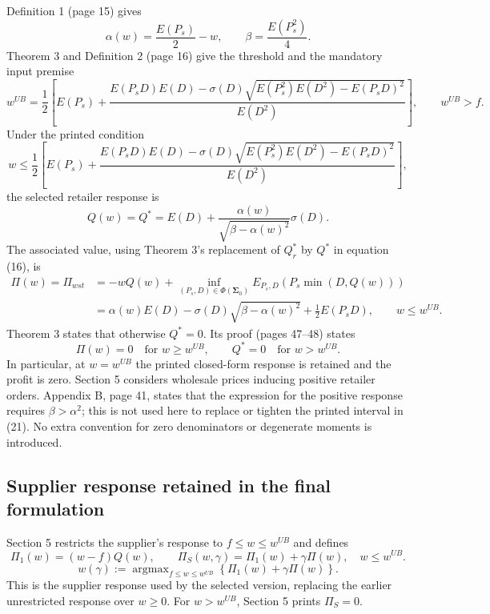 \documentclass{article}
\begin{document}
Definition 1 (page 15) gives
\[
\alpha(w)=\frac{E(P_s)}{2}-w,\qquad
\beta=\frac{E(P_s^2)}{4}.
\]
Theorem 3 and Definition 2 (page 16) give the threshold and the mandatory input premise
\[
w^{UB}=\frac12\left[
E(P_s)+
\frac{E(P_sD)E(D)-\sigma(D)\sqrt{E(P_s^2)E(D^2)-E(P_sD)^2}}
{E(D^2)}
\right],\qquad w^{UB}>f.
\]
Under the printed condition
\begin{equation}
w\leq\frac12\left[
E(P_s)+
\frac{E(P_sD)E(D)-\sigma(D)\sqrt{E(P_s^2)E(D^2)-E(P_sD)^2}}
{E(D^2)}
\right],
\tag{17}
\end{equation}
the selected retailer response is
\begin{equation}
Q(w)=Q^*=E(D)+\frac{\alpha(w)}{\sqrt{\beta-\alpha(w)^2}}\sigma(D).
\tag{18}
\end{equation}
The associated value, using Theorem 3's replacement of $Q_r^*$ by $Q^*$ in equation (16), is
\begin{equation}
\begin{aligned}
\Pi(w)=\Pi_{wst}
&=-wQ(w)+\inf_{(P_s,D)\in\Phi(\boldsymbol{\Sigma}_0)}
E_{P_s,D}\!\left(P_s\min(D,Q(w))\right)\\
&=\alpha(w)E(D)-\sigma(D)\sqrt{\beta-\alpha(w)^2}
+\frac12E(P_sD),\qquad w\leq w^{UB}.
\end{aligned}
\tag{16}
\end{equation}
Theorem 3 states that otherwise $Q^*=0$. Its proof (pages 47--48) states
\[
\Pi(w)=0\quad\text{for }w\geq w^{UB},\qquad
Q^*=0\quad\text{for }w>w^{UB}.
\]
In particular, at $w=w^{UB}$ the printed closed-form response is retained and the profit is zero. Section 5 considers wholesale prices inducing positive retailer orders. Appendix B, page 41, states that the expression for the positive response requires $\beta>\alpha^2$; this is not used here to replace or tighten the printed interval in (21). No extra convention for zero denominators or degenerate moments is introduced.

\subsection*{Supplier response retained in the final formulation}
Section 5 restricts the supplier's response to $f\leq w\leq w^{UB}$ and defines
\[
\Pi_1(w)=(w-f)Q(w),\qquad
\Pi_S(w,\gamma)=\Pi_1(w)+\gamma\Pi(w),\quad w\leq w^{UB}.
\]
\begin{equation}
w(\gamma):=\operatorname{argmax}_{f\leq w\leq w^{UB}}
\left\{\Pi_1(w)+\gamma\Pi(w)\right\}.
\tag{19}
\end{equation}
This is the supplier response used by the selected version, replacing the earlier unrestricted response over $w\geq0$. For $w>w^{UB}$, Section 5 prints $\Pi_S=0$.
\end{document}
